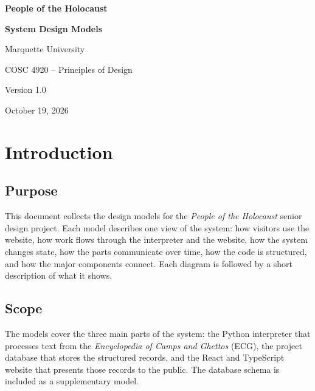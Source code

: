 \documentclass[11pt]{article}
\newcommand{\project}{\textit{People of the Holocaust}}
\newcommand{\ecg}{\textit{Encyclopedia of Camps and Ghettos}}
\begin{document}
\begin{titlepage}
  \centering
  \vspace*{\fill}
  {\LARGE\bfseries People of the Holocaust\par}
  \vspace{1.2em}
  {\Large\bfseries System Design Models\par}
  \vspace{2.5em}
  {\Large Marquette University\par}
  \vspace{0.6em}
  {\large COSC 4920 -- Principles of Design\par}
  \vspace{2.5em}
  {\large Version 1.0\par}
  \vspace{0.6em}
  {\large October 19, 2026\par}
  \vspace*{\fill}
\end{titlepage}

\tableofcontents
\listoffigures
\clearpage

\section{Introduction}

\subsection{Purpose}
This document collects the design models for the \project{} senior design
project. Each model describes one view of the system: how visitors use the
website, how work flows through the interpreter and the website, how the system
changes state, how the parts communicate over time, how the code is structured,
and how the major components connect. Each diagram is followed by a short
description of what it shows.

\subsection{Scope}
The models cover the three main parts of the system: the Python interpreter that
processes text from the \ecg{} (ECG), the project database that stores the
structured records, and the React and TypeScript website that presents those
records to the public. The database schema is included as a supplementary model.
\end{document}
